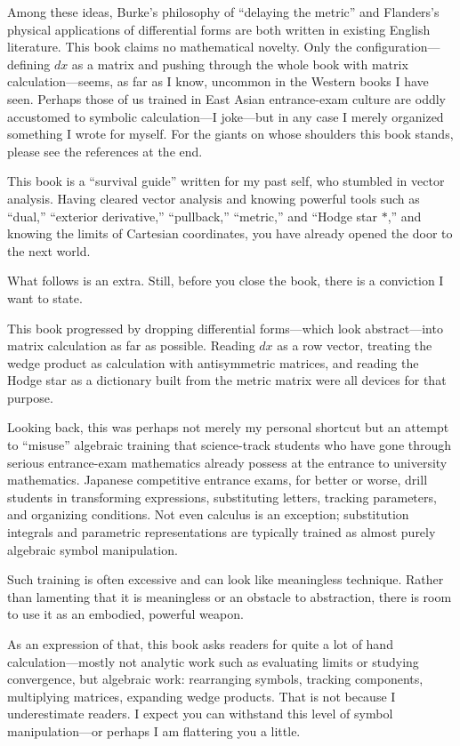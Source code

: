 \documentclass[a4paper,12pt,openany]{book}
\begin{document}
Among these ideas, Burke's philosophy of ``delaying the metric'' and
Flanders's physical applications of differential forms are both written
in existing English literature. This book claims no mathematical
novelty. Only the configuration—defining \(dx\) as a matrix and
pushing through the whole book with matrix calculation—seems, as far
as I know, uncommon in the Western books I have seen. Perhaps those of
us trained in East Asian entrance-exam culture are oddly accustomed to
symbolic calculation—I joke—but in any case I merely organized
something I wrote for myself. For the giants on whose shoulders this
book stands, please see the references at the end.

This book is a ``survival guide'' written for my past self, who stumbled
in vector analysis. Having cleared vector analysis and knowing powerful
tools such as ``dual,'' ``exterior derivative,'' ``pullback,''
``metric,'' and ``Hodge star \(\ast\),'' and knowing the limits of
Cartesian coordinates, you have already opened the door to the next
world.

What follows is an extra. Still, before you close the book, there is a
conviction I want to state.

This book progressed by dropping differential forms—which look
abstract—into matrix calculation as far as possible. Reading \(dx\) as
a row vector, treating the wedge product as calculation with
antisymmetric matrices, and reading the Hodge star as a dictionary built
from the metric matrix were all devices for that purpose.

Looking back, this was perhaps not merely my personal shortcut but an
attempt to ``misuse'' algebraic training that science-track students who
have gone through serious entrance-exam mathematics already possess at
the entrance to university mathematics. Japanese competitive entrance
exams, for better or worse, drill students in transforming expressions,
substituting letters, tracking parameters, and organizing conditions.
Not even calculus is an exception; substitution integrals and parametric
representations are typically trained as almost purely algebraic symbol
manipulation.

Such training is often excessive and can look like meaningless
technique. Rather than lamenting that it is meaningless or an obstacle
to abstraction, there is room to use it as an embodied, powerful weapon.

As an expression of that, this book asks readers for quite a lot of hand
calculation—mostly not analytic work such as evaluating limits or
studying convergence, but algebraic work: rearranging symbols, tracking
components, multiplying matrices, expanding wedge products. That is not
because I underestimate readers. I expect you can withstand this level
of symbol manipulation—or perhaps I am flattering you a little.
\end{document}
